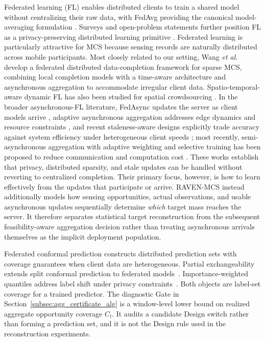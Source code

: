 \documentclass[letterpaper,journal]{IEEEtran}
\begin{document}
Federated learning (FL) enables distributed clients to train a shared model
without centralizing their raw data, with FedAvg providing the canonical
model-averaging formulation \cite{mcmahan2017communication,yang2019federated}.
Surveys and open-problem statements further position FL as a privacy-preserving
distributed learning primitive
\cite{kairouz2021advances,li2020federated}.  Federated learning is
particularly attractive for MCS because sensing records are naturally
distributed across mobile participants.  Most closely related to our setting,
Wang \emph{et al.}~\cite{wang2026federated} develop a federated distributed
data-completion framework for sparse MCS, combining local completion models
with a time-aware architecture and asynchronous aggregation to accommodate
irregular client data.  Spatio-temporal-aware dynamic FL has also been studied
for spatial crowdsourcing \cite{li2026stdfl}.  In the broader asynchronous-FL
literature, FedAsync updates the server as client models arrive
\cite{xie2019asynchronous}, adaptive asynchronous aggregation addresses edge
dynamics and resource constraints
\cite{liu2023adaptive,sun2024staleness}, and recent staleness-aware designs
explicitly trade accuracy against system efficiency under heterogeneous client
speeds \cite{sun2024staleness}; most recently, semi-asynchronous aggregation
with adaptive weighting and selective training has been proposed to reduce
communication and computation cost \cite{islam2025seafl}.  These
works establish that privacy, distributed sparsity, and stale updates can be
handled without reverting to centralized completion.  Their primary focus,
however, is how to learn effectively from the updates that participate or
arrive.  RAVEN-MCS instead additionally models how sensing opportunities,
actual observations, and usable asynchronous updates sequentially determine
\emph{which} target mass reaches the server.  It therefore separates
statistical target reconstruction from the subsequent feasibility-aware
aggregation decision rather than treating asynchronous arrivals themselves as
the implicit deployment population.

Federated conformal prediction constructs distributed prediction sets
with coverage guarantees when client data are heterogeneous.
Partial exchangeability extends split conformal prediction to federated
models~\cite{lu2023federated}.
Importance-weighted quantiles address label shift under privacy
constraints~\cite{plassier2023conformal}.
Both objects are label-set coverage for a trained predictor.
The diagnostic Gate in Section~\ref{subsec:agg_certificate_alg} is a
window-level lower bound on realized aggregate opportunity coverage
$C_t$.  It audits a candidate Design switch rather than forming a
prediction set, and it is not the Design rule used in the reconstruction
experiments.
\end{document}
